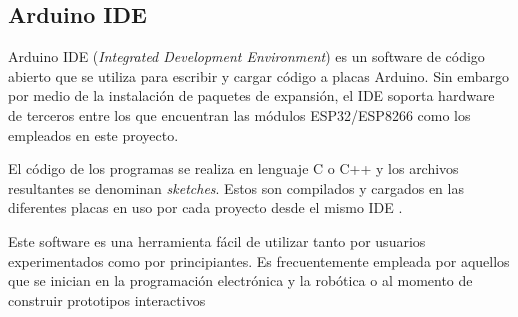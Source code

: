 
\subsection{Arduino IDE}
\label{sec:Arduino IDE}

Arduino IDE (\textit{Integrated Development Environment}) es un software de código abierto que se utiliza para escribir y cargar código a placas Arduino. Sin embargo por medio de la instalación de paquetes de expansión, el IDE soporta hardware de terceros entre los que encuentran las módulos ESP32/ESP8266 \citep{Arduinosupport} como los empleados en este proyecto.

El código de los programas se realiza en lenguaje C o C++ y los archivos resultantes se denominan \textit{sketches}. Estos son compilados y cargados en las diferentes placas en uso por cada proyecto desde el mismo IDE \citep{arduinoide}.

Este software es una herramienta fácil de utilizar tanto por usuarios experimentados como por principiantes. Es frecuentemente empleada por aquellos que se inician en la programación electrónica y la robótica o al momento de construir prototipos interactivos \citep{arduinoide:2} 
 

